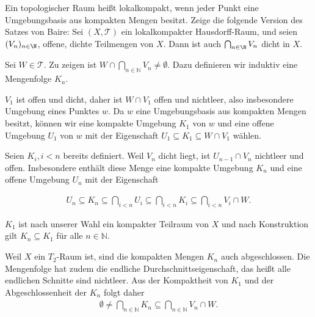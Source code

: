 \begin{exercise}
Ein topologischer Raum heißt lokalkompakt, wenn jeder Punkt eine Umgebungsbasis
aus kompakten Mengen besitzt. Zeige die folgende Version des Satzes von Baire:
Sei $(X,\mathcal{T})$ ein lokalkompakter Hausdorff-Raum, und seien $(V_n)_{n \in \N}$,
offene, dichte Teilmengen von $X$. Dann ist auch $\bigcap_{n \in \N} V_n$ dicht in $X$.
\end{exercise}
\begin{solution}
  Sei $W \in \mathcal{T}.$ Zu zeigen ist $W \cap \bigcap_{n \in \mathbb{N}} V_n \neq \emptyset.$ Dazu definieren wir induktiv eine Mengenfolge $K_n$.

  $V_1$ ist offen und dicht, daher ist $W \cap V_1$ offen und nichtleer, also insbesondere Umgebung eines Punktes $w$. Da $w$ eine Umgebungsbasis aus kompakten Mengen besitzt, können wir eine kompakte Umgebung $K_1$ von $w$ und eine offene Umgebung $U_1$ von $w$ mit der Eigenschaft $U_1 \subseteq K_1 \subseteq W \cap V_1$ wählen.

  Seien $K_i, i < n$ bereits definiert. Weil $V_n$ dicht liegt, ist $U_{n-1} \cap V_n$ nichtleer und offen. Insbesondere enthält diese Menge eine kompakte Umgebung $K_n$ und eine offene Umgebung $U_n$ mit der Eigenschaft

  \begin{align}
      U_n \subseteq K_n \subseteq \bigcap_{i < n} U_i
      \subseteq \bigcap_{i < n} K_i \subseteq \bigcap_{i < n} V_i \cap W.
  \end{align}

  $K_1$ ist nach unserer Wahl ein kompakter Teilraum von $X$ und nach Konstruktion gilt $K_n \subseteq K_1$ für alle $n \in \mathbb{N}$.

  Weil $X$ ein $T_2$-Raum ist, sind die kompakten Mengen $K_n$ auch abgeschlossen. Die Mengenfolge hat zudem die endliche Durchschnittseigenschaft, das heißt alle endlichen Schnitte sind nichtleer. Aus der Kompaktheit von $K_1$ und der Abgeschlossenheit der $K_n$ folgt daher
  \begin{align}
      \emptyset \neq \bigcap_{n \in \mathbb{N}} K_n \subseteq \bigcap_{n \in \mathbb{N}} V_n \cap W.
  \end{align}
\end{solution}
